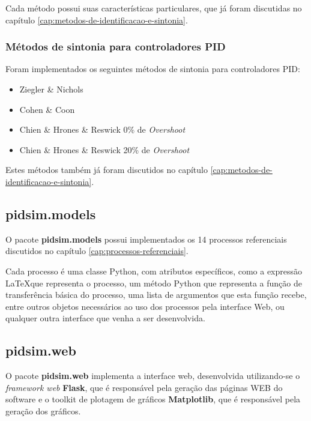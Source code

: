             Cada método possui suas características particulares, que já foram discutidas no capítulo
            \ref{cap:metodos-de-identificacao-e-sintonia}.

        \subsubsection{Métodos de sintonia para controladores \acs{PID}}
            
            Foram implementados os seguintes métodos de sintonia para controladores \acs{PID}:

            \begin{itemize}
                \item Ziegler \& Nichols
                \item Cohen \& Coon
                \item Chien \& Hrones \& Reswick 0\% de \textit{Overshoot}
                \item Chien \& Hrones \& Reswick 20\% de \textit{Overshoot}
            \end{itemize}

            Estes métodos também já foram discutidos no capítulo
            \ref{cap:metodos-de-identificacao-e-sintonia}.

        \subsection{pidsim.models}
            
            O pacote \textbf{pidsim.models} possui implementados os 14 processos referenciais
            discutidos no capítulo \ref{cap:processos-referenciais}.

            Cada processo é uma classe Python, com atributos específicos, como a expressão
            \LaTeX que representa o processo, um método Python que representa a função de
            transferência básica do processo, uma lista de argumentos que esta função recebe,
            entre outros objetos necessários ao uso dos processos pela interface Web, ou qualquer
            outra interface que venha a ser desenvolvida.

        \subsection{pidsim.web}
            
            O pacote \textbf{pidsim.web} implementa a interface web, desenvolvida utilizando-se
            o \textit{framework web} \textbf{Flask}, que é responsável pela geração das páginas
            WEB do software e o toolkit de plotagem de gráficos \textbf{Matplotlib}, que é
            responsável pela geração dos gráficos.


